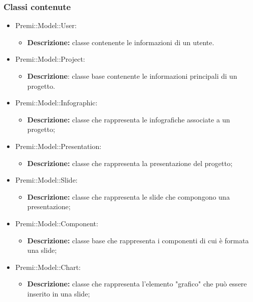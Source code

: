 	\subsubsection*{Classi contenute}
	\begin{itemize}
		\item Premi::Model::User:
		\begin{itemize}
			\item \textbf{Descrizione:} classe contenente le informazioni di un utente.
		\end{itemize}
		\item Premi::Model::Project:
		\begin{itemize}
			\item \textbf{Descrizione}: classe base contenente le informazioni principali di un progetto.
		\end{itemize}
			
		\item Premi::Model::Infographic:
		\begin{itemize}
			\item \textbf{Descrizione:} classe che rappresenta le infografiche associate a un progetto;
		\end{itemize}
		
		\item Premi::Model::Presentation:
		\begin{itemize}
			\item \textbf{Descrizione:} classe che rappresenta la presentazione del progetto;
		\end{itemize}
		
		\item Premi::Model::Slide:
		\begin{itemize}
			\item \textbf{Descrizione:} classe che rappresenta le \gls{slide} che compongono una presentazione;
		\end{itemize}
		
		\item Premi::Model::Component:
		\begin{itemize}
			\item \textbf{Descrizione:} classe base che rappresenta i componenti di cui è formata una \gls{slide};
		\end{itemize}
		
		\item Premi::Model::Chart:
		\begin{itemize}
			\item \textbf{Descrizione:} classe che rappresenta l'elemento "grafico" che può essere inserito in una \gls{slide};
		\end{itemize}
		

\end{itemize}
